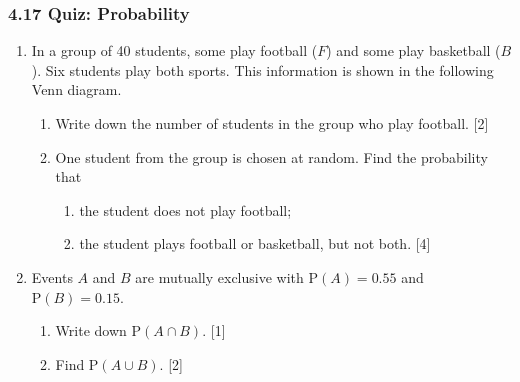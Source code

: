 \documentclass[12pt, twoside]{article}
\begin{document}
\subsubsection*{4.17 Quiz: Probability}
\begin{enumerate}[itemsep=0.1cm]


\item In a group of 40 students, some play football ($F$) and some play basketball ($B$).
Six students play both sports. This information is shown in the following Venn diagram.

\begin{center}
\end{center}

\begin{enumerate}[itemsep=0.25cm]
  \item Write down the number of students in the group who play football. \hfill [2]
  \item One student from the group is chosen at random. Find the probability that
  \begin{enumerate}[label=(\roman*), itemsep=0.25cm]
    \item the student does not play football;
    \item the student plays football or basketball, but not both. \hfill [4]
  \end{enumerate}
\end{enumerate}



\item Events $A$ and $B$ are mutually exclusive with
$\mathrm{P}(A) = 0.55$ and $\mathrm{P}(B) = 0.15$.

\begin{enumerate}[itemsep=0.25cm]
  \item Write down $\mathrm{P}(A \cap B)$. \hfill [1]
  \item Find $\mathrm{P}(A \cup B)$. \hfill [2]
\end{enumerate}


\end{enumerate}
\end{document}
